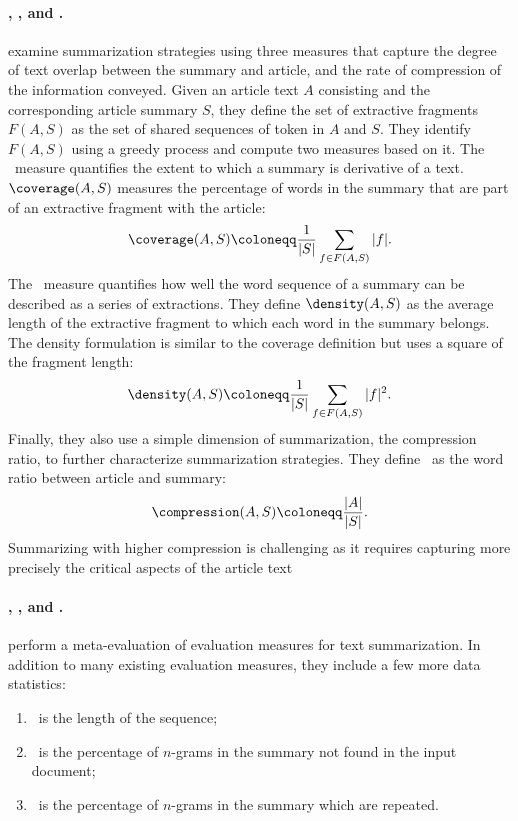 \paragraph{\coverage, \density, and \compression.}
\citet{grusky-etal-2018-newsroom} examine summarization strategies using three measures that capture the degree of text overlap between the summary and article, and the rate of compression of the information conveyed. Given an article text $A$ consisting and the corresponding article summary $S$, they define the set of extractive fragments $F(A,S)$ as the set of shared sequences of token in $A$ and $S$. They identify $F(A,S)$ using a greedy process and compute two measures based on it. The \coverage\ measure quantifies the extent to which a summary is derivative of a text. $\coverage(A, S)$ measures the percentage of words in the summary that are part of an extractive fragment with the article:
\[ \coverage(A,S) \coloneqq \frac{1}{|S|} \sum_{f \in F(A,S)} |f| .\]
The \density\ measure quantifies how well the word sequence of a summary can be described as a series of extractions. They define $\density(A, S)$ as the average length of the extractive fragment to which each word in the summary belongs. The density formulation is similar to the coverage definition but uses a square of the fragment length:
\[ \density(A,S) \coloneqq \frac{1}{|S|} \sum_{f \in F(A,S)} |f|^2 .\]
Finally, they also use a simple dimension of summarization, the compression ratio, to further characterize summarization strategies. They define \compression\ as the word ratio between article and summary:
\[ \compression(A,S) \coloneqq \frac{|A|}{|S|} . \]
Summarizing with higher compression is challenging as it requires capturing more precisely the critical aspects of the article text

\paragraph{\tlength, \novelty, and \repetition.}
\citet{fabbri2021summeval} perform a meta-evaluation of evaluation measures for text summarization. In addition to many existing evaluation measures, they include a few more data statistics:
\begin{enumerate}[noitemsep]
    \item \tlength\ is the length of the sequence;
    \item \novelty\ is the percentage of $n$-grams in the summary not found in the input document;
    \item \repetition\ is the percentage of $n$-grams in the summary which are repeated.
\end{enumerate}

